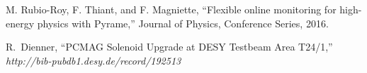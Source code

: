 \documentclass[journal]{IEEEtran}
\begin{document}
\begin{thebibliography}{1}
  M. Rubio-Roy, F. Thiant, and F. Magniette,
  ``Flexible online monitoring for high-energy physics with Pyrame,''
  Journal of Physics, Conference Series, 2016. 
  


  R.~Dienner,
  ``PCMAG Solenoid Upgrade at DESY Testbeam Area T24/1,''
  \emph{http://bib-pubdb1.desy.de/record/192513}
  
\end{thebibliography}



% 










\end{document}
